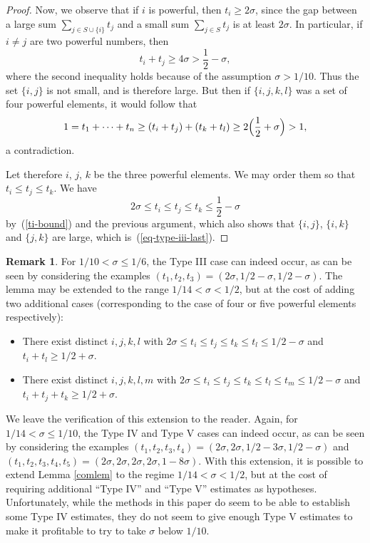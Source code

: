 \documentclass[12pt,a4paper,reqno]{amsart}
\numberwithin{equation}{section}
\theoremstyle{plain}
\theoremstyle{definition}
\newtheorem{remark}[theorem]{Remark}
\begin{document}
\begin{proof}
Now, we observe that if $i$ is powerful, then $t_i\geq 2\sigma$, since
the gap between a large sum $\sum_{j \in S \cup \{i\}} t_j$ and a
small sum $\sum_{j \in S} t_j$ is at least $2\sigma$. In particular,
if $i\neq j$ are two powerful numbers, then
$$
t_i+t_j\geq 4\sigma>\frac{1}{2}-\sigma,
$$
where the second inequality holds because of the assumption
$\sigma>1/10$. Thus the set $\{i,j\}$ is not small, and is therefore
large. But then if  $\{i,j,k,l\}$ was a set of four powerful elements,
it would follow that
$$
1=t_1+\cdots+t_n\geq (t_i+t_j)+(t_k+t_l)\geq
2\Bigl(\frac{1}{2}+\sigma\Bigr)>1,
$$
a contradiction.

Let therefore $i$, $j$, $k$ be the three powerful elements. We may
order them so that $t_i\leq t_j\leq t_k$. We have
$$
2\sigma\leq t_i\leq t_j\leq t_k\leq \frac{1}{2}-\sigma
$$
by~(\ref{ti-bound}) and the previous argument, which also shows that
$\{i,j\}$, $\{i,k\}$ and $\{j,k\}$ are large, which
is~(\ref{eq-type-iii-last}).
\end{proof}

\begin{remark}\label{type-iv} For $1/10 < \sigma \leq 1/6$, the Type
  III case can indeed occur, as can be seen by considering the
  examples $(t_1,t_2,t_3) = (2\sigma, 1/2-\sigma, 1/2-\sigma)$.  The
  lemma may be extended to the range $1/14 < \sigma < 1/2$, but at the
  cost of adding two additional cases (corresponding to the case of
  four or five powerful elements respectively):
\begin{itemize}
\item[(Type IV)] There exist distinct $i,j,k,l$ with $2\sigma \leq t_i \leq t_j \leq t_k \leq t_l \leq 1/2-\sigma$ and $t_i+t_l \geq 1/2 + \sigma$.
\item[(Type V)] There exist distinct $i,j,k,l,m$ with $2\sigma \leq t_i \leq t_j \leq t_k \leq t_l \leq t_m \leq 1/2-\sigma$ and $t_i+t_j+t_k \geq 1/2 + \sigma$.
\end{itemize}
We leave the verification of this extension to the reader. Again, for
$1/14 < \sigma \leq 1/10$, the Type IV and Type V cases can indeed
occur, as can be seen by considering the examples $(t_1,t_2,t_3,t_4) =
(2\sigma, 2\sigma, 1/2-3\sigma, 1/2-\sigma)$ and
$(t_1,t_2,t_3,t_4,t_5) = (2\sigma,2\sigma,2\sigma,2\sigma,1-8\sigma)$.
With this extension, it is possible to extend Lemma \ref{comlem} to
the regime $1/14 < \sigma < 1/2$, but at the cost of requiring
additional ``Type IV'' and ``Type V'' estimates as hypotheses.
Unfortunately, while the methods in this paper do seem to be able to
establish some Type IV estimates, they do not seem to give enough Type
V estimates to make it profitable to try to take $\sigma$ below
$1/10$. 
\end{remark}
\end{document}
